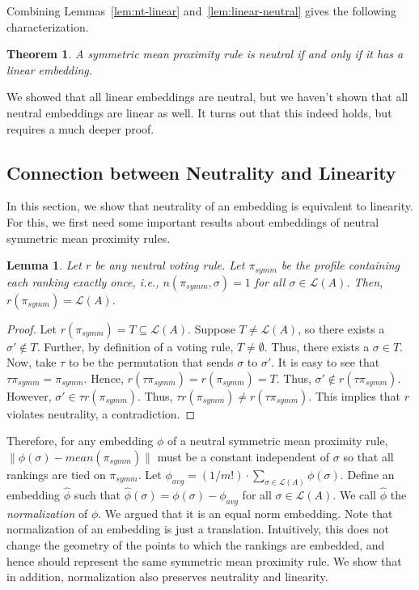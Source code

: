 \documentclass[10pt,letterpaper]{article}
\newcommand{\calL}{{\mathcal{L}}}
\newcommand{\rank}{{\calL(A)}}
\newtheorem{theorem}{Theorem}
\newtheorem{lemma}{Lemma}
\begin{document}
Combining Lemmas~\ref{lem:nt-linear} and~\ref{lem:linear-neutral} gives the following characterization.
\begin{theorem}
A symmetric mean proximity rule is neutral if and only if it has a linear embedding.
\label{thm:linear-char}
\end{theorem}

We showed that all linear embeddings are neutral, but we haven't shown that all neutral embeddings are linear as well. It turns out that this indeed holds, but requires a much deeper proof.

\subsection{Connection between Neutrality and Linearity}

In this section, we show that neutrality of an embedding is equivalent to linearity. For this, we first need some important results about embeddings of neutral symmetric mean proximity rules.

\begin{lemma}
Let $r$ be any neutral voting rule. Let $\pi_{symm}$ be the profile containing each ranking exactly once, i.e., $n(\pi_{symm},\sigma) = 1$ for all $\sigma \in \rank$. Then, $r(\pi_{symm}) = \rank$. 
\label{lem:average-profile}
\end{lemma}
\begin{proof}
Let $r(\pi_{symm}) = T \subseteq \rank$. Suppose $T \neq \rank$, so there exists a $\sigma' \notin T$. Further, by definition of a voting rule, $T \neq \emptyset$. Thus, there exists a $\sigma \in T$. Now, take $\tau$ to be the permutation that sends $\sigma$ to $\sigma'$. %
It is easy to see that $\tau \pi_{symm} = \pi_{symm}$. Hence, $r(\tau \pi_{symm}) = r(\pi_{symm}) = T$. Thus, $\sigma' \notin r(\tau \pi_{symm})$. However, $\sigma' \in \tau r(\pi_{symm})$. Thus, $\tau r(\pi_{symm}) \neq r(\tau \pi_{symm})$. This implies that $r$ violates neutrality, a contradiction. 
\end{proof}

Therefore, for any embedding $\phi$ of a neutral symmetric mean proximity rule, $\|\phi(\sigma)-mean(\pi_{symm})\|$ must be a constant independent of $\sigma$ so that all rankings are tied on $\pi_{symm}$. Let $\phi_{avg} = (1/{m!}) \cdot \sum_{\sigma \in \rank} \phi(\sigma)$. Define an embedding $\hat{\phi}$  such that $\hat{\phi}(\sigma) = \phi(\sigma) - \phi_{avg}$ for all $\sigma \in \rank$. We call $\hat{\phi}$ the \emph{normalization} of $\phi$. We argued that it is an equal norm embedding. Note that normalization of an embedding is just a translation. Intuitively, this does not change the geometry of the points to which the rankings are embedded, and hence should represent the same symmetric mean proximity rule. We show that in addition, normalization also preserves neutrality and linearity. 
\end{document}
